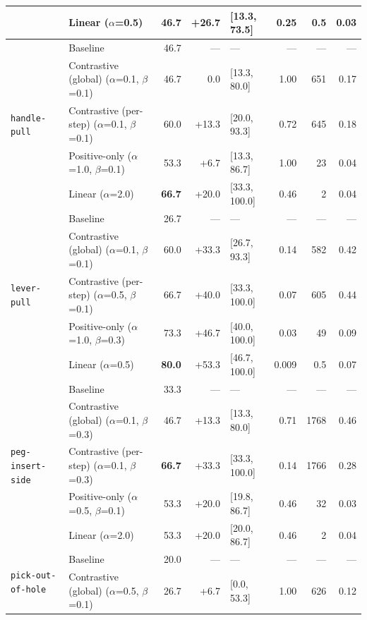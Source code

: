 \begin{table}[p]
{\begin{tabular}{@{}ll r r l r r r@{}}
   & Linear \scriptsize{($\alpha$=0.5)} & 46.7 & +26.7 & [13.3, 73.5] & 0.25 & 0.5 & 0.03 \\
\midrule
  \multirow{5}{*}{\texttt{handle-pull}} & Baseline & 46.7 & --- & --- & --- & --- & --- \\
   & Contrastive (global) \scriptsize{($\alpha$=0.1, $\beta$=0.1)} & 46.7 & 0.0 & [13.3, 80.0] & 1.00 & 651 & 0.17 \\
   & Contrastive (per-step) \scriptsize{($\alpha$=0.1, $\beta$=0.1)} & 60.0 & +13.3 & [20.0, 93.3] & 0.72 & 645 & 0.18 \\
   & Positive-only \scriptsize{($\alpha$=1.0, $\beta$=0.1)} & 53.3 & +6.7 & [13.3, 86.7] & 1.00 & 23 & 0.04 \\
   & Linear \scriptsize{($\alpha$=2.0)} & \textbf{66.7} & +20.0 & [33.3, 100.0] & 0.46 & 2 & 0.04 \\
\midrule
  \multirow{5}{*}{\texttt{lever-pull}} & Baseline & 26.7 & --- & --- & --- & --- & --- \\
   & Contrastive (global) \scriptsize{($\alpha$=0.1, $\beta$=0.1)} & 60.0 & +33.3 & [26.7, 93.3] & 0.14 & 582 & 0.42 \\
   & Contrastive (per-step) \scriptsize{($\alpha$=0.5, $\beta$=0.1)} & 66.7 & +40.0 & [33.3, 100.0] & 0.07 & 605 & 0.44 \\
   & Positive-only \scriptsize{($\alpha$=1.0, $\beta$=0.3)} & 73.3 & +46.7 & [40.0, 100.0] & 0.03 & 49 & 0.09 \\
   & Linear \scriptsize{($\alpha$=0.5)} & \textbf{80.0} & +53.3 & [46.7, 100.0] & 0.009 & 0.5 & 0.07 \\
\midrule
  \multirow{5}{*}{\texttt{peg-insert-side}} & Baseline & 33.3 & --- & --- & --- & --- & --- \\
   & Contrastive (global) \scriptsize{($\alpha$=0.1, $\beta$=0.3)} & 46.7 & +13.3 & [13.3, 80.0] & 0.71 & 1768 & 0.46 \\
   & Contrastive (per-step) \scriptsize{($\alpha$=0.1, $\beta$=0.3)} & \textbf{66.7} & +33.3 & [33.3, 100.0] & 0.14 & 1766 & 0.28 \\
   & Positive-only \scriptsize{($\alpha$=0.5, $\beta$=0.1)} & 53.3 & +20.0 & [19.8, 86.7] & 0.46 & 32 & 0.03 \\
   & Linear \scriptsize{($\alpha$=2.0)} & 53.3 & +20.0 & [20.0, 86.7] & 0.46 & 2 & 0.04 \\
\midrule
  \multirow{5}{*}{\texttt{pick-out-of-hole}} & Baseline & 20.0 & --- & --- & --- & --- & --- \\
   & Contrastive (global) \scriptsize{($\alpha$=0.5, $\beta$=0.1)} & 26.7 & +6.7 & [0.0, 53.3] & 1.00 & 626 & 0.12 \\

\end{tabular}}
\end{table}
